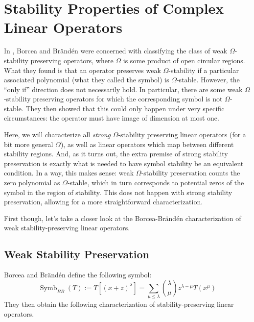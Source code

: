 \documentclass{article}
\theoremstyle{definition}
\theoremstyle{plain}
\DeclareMathOperator{\Symb}{Symb}
\begin{document}
\section{Stability Properties of Complex Linear Operators}\label{Cops_sect}

In \cite{bb1}, Borcea and Br{\"a}nd{\'e}n were concerned with classifying the class of weak $\Omega$-stability preserving operators, where $\Omega$ is some product of open circular regions. What they found is that an operator preserves weak $\Omega$-stability if a particular associated polynomial (what they called the symbol) is $\Omega$-stable. However, the ``only if'' direction does not necessarily hold. In particular, there are some weak $\Omega$-stability preserving operators for which the corresponding symbol is not $\Omega$-stable. They then showed that this could only happen under very specific circumstances: the operator must have image of dimension at most one.

Here, we will characterize all \emph{strong} $\Omega$-stability preserving linear operators (for a bit more general $\Omega$), as well as linear operators which map between different stability regions. And, as it turns out, the extra premise of strong stability preservation is exactly what is needed to have symbol stability be an equivalent condition. In a way, this makes sense: weak $\Omega$-stability preservation counts the zero polynomial as $\Omega$-stable, which in turn corresponds to potential zeros of the symbol in the region of stability. This does not happen with strong stability preservation, allowing for a more straightforward characterization.

First though, let's take a closer look at the Borcea-Br{\"a}nd{\'e}n characterization of weak stability-preserving linear operators.

\subsection{Weak Stability Preservation}

Borcea and Br{\"a}nd{\'e}n define the following symbol:
\[
    \Symb_{BB}(T) := T[(x+z)^\lambda] = \sum_{\mu \leq \lambda} \binom{\lambda}{\mu} z^{\lambda-\mu} T(x^\mu)
\]
They then obtain the following characterization of stability-preserving linear operators.
\end{document}
